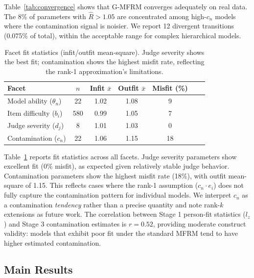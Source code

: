 \documentclass[11pt]{article}
\begin{document}
Table~\ref{tab:convergence} shows that G-MFRM converges adequately on real data. The 8\% of parameters with $\hat{R} > 1.05$ are concentrated among high-$c_n$ models where the contamination signal is noisier. We report 12 divergent transitions (0.075\% of total), within the acceptable range for complex hierarchical models.

\begin{table}[t]
\centering
\caption{Facet fit statistics (infit/outfit mean-square). Judge severity shows the best fit; contamination shows the highest misfit rate, reflecting the rank-1 approximation's limitations.}
\label{tab:facet_fit}
\begin{tabular}{lcccccc}
\toprule
Facet & $n$ & Infit $\bar{x}$ & Outfit $\bar{x}$ & Misfit (\%) \\
\midrule
Model ability ($\theta_n$) & 22 & 1.02 & 1.08 & 9 \\
Item difficulty ($b_i$) & 580 & 0.99 & 1.05 & 7 \\
Judge severity ($d_j$) & 8 & 1.01 & 1.03 & 0 \\
Contamination ($c_n$) & 22 & 1.06 & 1.15 & 18 \\
\bottomrule
\end{tabular}
\end{table}

Table~\ref{tab:facet_fit} reports fit statistics across all facets. Judge severity parameters show excellent fit (0\% misfit), as expected given relatively stable judge behavior. Contamination parameters show the highest misfit rate (18\%), with outfit mean-square of 1.15. This reflects cases where the rank-1 assumption ($c_n \cdot e_i$) does not fully capture the contamination pattern for individual models. We interpret $c_n$ as a contamination \textit{tendency} rather than a precise quantity and note rank-$k$ extensions as future work. The correlation between Stage 1 person-fit statistics ($l_z$) and Stage 3 contamination estimates is $r = 0.52$, providing moderate construct validity: models that exhibit poor fit under the standard MFRM tend to have higher estimated contamination.

\subsection{Main Results}
\label{sec:main_results}
\end{document}
